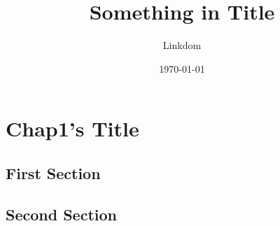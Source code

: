 \documentclass{article}
\title{Something in Title}
\author{Linkdom}
\date{\today}
\begin{document}
\maketitle
\else
\chapter{Chap1's Title}
\fi
\section{First Section}
\section{Second Section}
\ifx\allfiles\undefined
\end{document}
